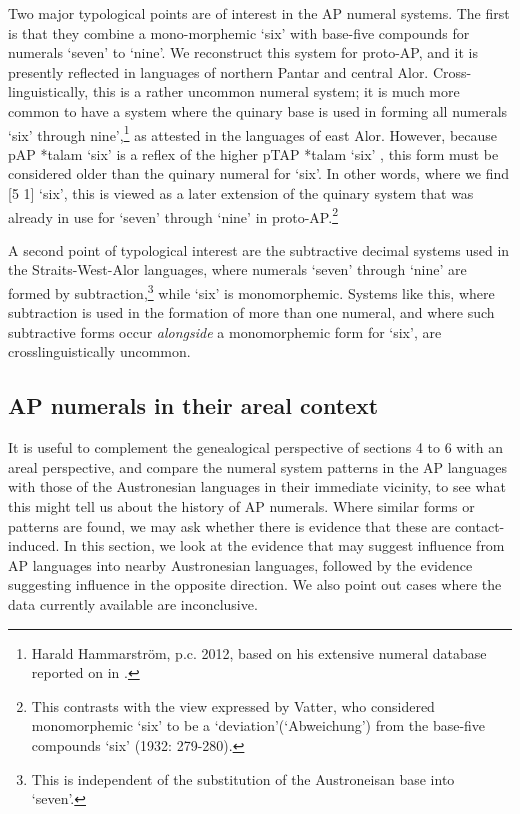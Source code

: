 Two major typological points are of interest in the AP numeral systems. The first is that they combine a mono-morphemic `six' with base-five compounds for numerals `seven' to `nine'. We reconstruct this system for proto-AP, and it is presently reflected in languages of northern Pantar and central Alor. Cross-linguistically, this is a rather uncommon numeral system; it is much more common to have a system where the quinary base is used in forming all numerals `six' through nine',\footnote{Harald Hammarstr\"om, p.c. 2012, based on his extensive numeral database reported on in \citet{Hammarstrom2010}.} as attested in the languages of east Alor. However, because pAP *talam `six' is a reflex of the higher pTAP *talam `six' \citep{SchapperEtAlTVtimor},   this form must be considered older than the quinary numeral for `six'. In other words, where we find [5 1] `six', this is viewed as a later extension of the quinary system that was already in use for `seven' through `nine' in proto-AP.\footnote{This contrasts with the view expressed by Vatter, who considered monomorphemic `six' to be a `deviation'(`Abweichung') from the base-five compounds `six' (1932: 279-280).}\nocite{Vatter1932}

A second point of typological interest are the subtractive decimal systems used in the Straits-West-Alor languages, where numerals `seven' through `nine' are formed by subtraction,\footnote{This is independent of the substitution of the Austroneisan base into `seven'.} while `six' is monomorphemic. Systems like this, where subtraction is used in the formation of more than one numeral, and where such subtractive forms occur \textit{alongside} a monomorphemic form for `six', are crosslinguistically uncommon. 

\subsection{AP numerals in their areal context}\label{sec:6:7.2}
It is useful to complement the genealogical perspective of sections 4 to 6 with an areal perspective, and compare the numeral system patterns in the AP  languages with those of the Austronesian languages in their immediate vicinity, to see what this might tell us about the history of AP numerals. Where similar forms or patterns are found, we may ask whether there is evidence that these are contact-induced. In this section, we look at the evidence that may suggest influence from AP languages into nearby Austronesian languages, followed by the evidence suggesting influence in the opposite direction. We also point out cases where the data currently available are inconclusive. 

